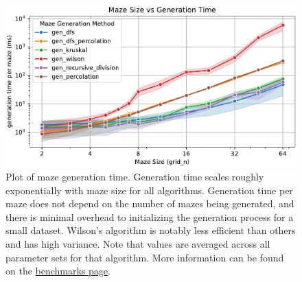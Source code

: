 \begin{figure}
	\centering
	\includegraphics[width=\textwidth]{figures/benchmarks/gridsize-vs-gentime.pdf}
	\caption{
		Plot of maze generation time. Generation time scales
		roughly exponentially with maze size for all algorithms. Generation time per
		maze does not depend on the number of mazes being generated, and there
		is minimal overhead to initializing the generation process for a small
		dataset. Wilson's algorithm is notably less efficient than others and
		has high variance. Note that values are averaged across all parameter
		sets for that algorithm. More information can be found on the
		\href{https://understanding-search.github.io/maze-dataset/benchmarks/}{benchmarks page}.
	}
	\label{fig:benchmarks}
\end{figure}